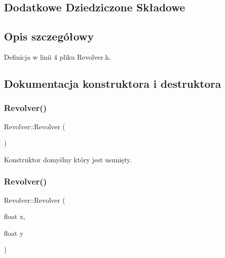\subsection*{Dodatkowe Dziedziczone Składowe}


\subsection{Opis szczegółowy}


Definicja w linii 4 pliku Revolver.\+h.



\subsection{Dokumentacja konstruktora i destruktora}
\mbox{\label{class_revolver_ab4d4360bde9164e0f697a7fe3f91d8aa}} 
\subsubsection{\texorpdfstring{Revolver()}{Revolver()}\hspace{0.1cm}{\footnotesize\ttfamily [1/2]}}
{\footnotesize\ttfamily Revolver\+::\+Revolver (\begin{DoxyParamCaption}{ }\end{DoxyParamCaption})\hspace{0.3cm}{\ttfamily [delete]}}



Konstruktor domyślny który jest usunięty. 

\mbox{\label{class_revolver_a91db226199031f40f2789321108e2569}} 
\subsubsection{\texorpdfstring{Revolver()}{Revolver()}\hspace{0.1cm}{\footnotesize\ttfamily [2/2]}}
{\footnotesize\ttfamily Revolver\+::\+Revolver (\begin{DoxyParamCaption}\item[{float}]{x,  }\item[{float}]{y }\end{DoxyParamCaption})}



